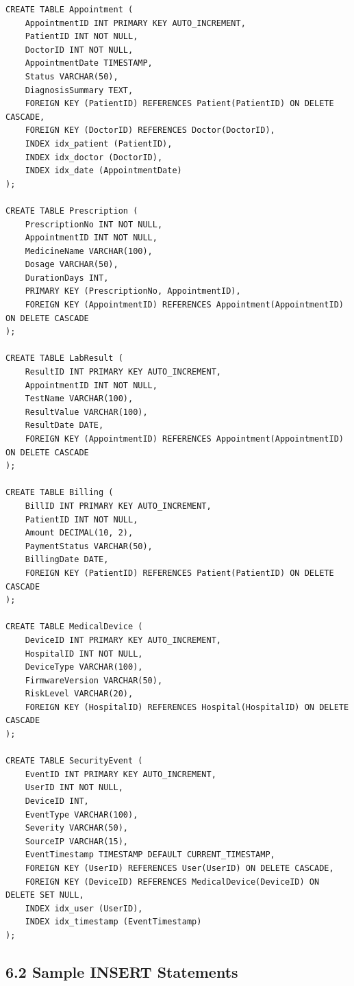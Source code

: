 \begin{verbatim}
CREATE TABLE Appointment (
    AppointmentID INT PRIMARY KEY AUTO_INCREMENT,
    PatientID INT NOT NULL,
    DoctorID INT NOT NULL,
    AppointmentDate TIMESTAMP,
    Status VARCHAR(50),
    DiagnosisSummary TEXT,
    FOREIGN KEY (PatientID) REFERENCES Patient(PatientID) ON DELETE CASCADE,
    FOREIGN KEY (DoctorID) REFERENCES Doctor(DoctorID),
    INDEX idx_patient (PatientID),
    INDEX idx_doctor (DoctorID),
    INDEX idx_date (AppointmentDate)
);

CREATE TABLE Prescription (
    PrescriptionNo INT NOT NULL,
    AppointmentID INT NOT NULL,
    MedicineName VARCHAR(100),
    Dosage VARCHAR(50),
    DurationDays INT,
    PRIMARY KEY (PrescriptionNo, AppointmentID),
    FOREIGN KEY (AppointmentID) REFERENCES Appointment(AppointmentID) ON DELETE CASCADE
);

CREATE TABLE LabResult (
    ResultID INT PRIMARY KEY AUTO_INCREMENT,
    AppointmentID INT NOT NULL,
    TestName VARCHAR(100),
    ResultValue VARCHAR(100),
    ResultDate DATE,
    FOREIGN KEY (AppointmentID) REFERENCES Appointment(AppointmentID) ON DELETE CASCADE
);

CREATE TABLE Billing (
    BillID INT PRIMARY KEY AUTO_INCREMENT,
    PatientID INT NOT NULL,
    Amount DECIMAL(10, 2),
    PaymentStatus VARCHAR(50),
    BillingDate DATE,
    FOREIGN KEY (PatientID) REFERENCES Patient(PatientID) ON DELETE CASCADE
);

CREATE TABLE MedicalDevice (
    DeviceID INT PRIMARY KEY AUTO_INCREMENT,
    HospitalID INT NOT NULL,
    DeviceType VARCHAR(100),
    FirmwareVersion VARCHAR(50),
    RiskLevel VARCHAR(20),
    FOREIGN KEY (HospitalID) REFERENCES Hospital(HospitalID) ON DELETE CASCADE
);

CREATE TABLE SecurityEvent (
    EventID INT PRIMARY KEY AUTO_INCREMENT,
    UserID INT NOT NULL,
    DeviceID INT,
    EventType VARCHAR(100),
    Severity VARCHAR(50),
    SourceIP VARCHAR(15),
    EventTimestamp TIMESTAMP DEFAULT CURRENT_TIMESTAMP,
    FOREIGN KEY (UserID) REFERENCES User(UserID) ON DELETE CASCADE,
    FOREIGN KEY (DeviceID) REFERENCES MedicalDevice(DeviceID) ON DELETE SET NULL,
    INDEX idx_user (UserID),
    INDEX idx_timestamp (EventTimestamp)
);
\end{verbatim}

\subsection*{6.2 Sample INSERT Statements}

